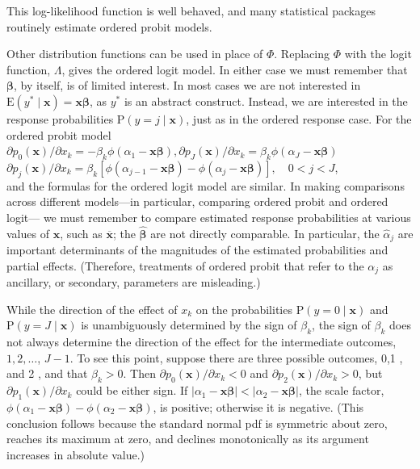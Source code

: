 \documentclass[10pt]{article}
\begin{document}
This log-likelihood function is well behaved, and many statistical packages routinely estimate ordered probit models.

Other distribution functions can be used in place of $\Phi$. Replacing $\Phi$ with the logit function, $\Lambda$, gives the ordered logit model. In either case we must remember that $\boldsymbol{\beta}$, by itself, is of limited interest. In most cases we are not interested in $\mathrm{E}\left(y^{*} \mid \mathbf{x}\right)=\mathbf{x} \boldsymbol{\beta}$, as $y^{*}$ is an abstract construct. Instead, we are interested in the response probabilities $\mathrm{P}(y=j \mid \mathbf{x})$, just as in the ordered response case. For the ordered probit model\\
$\partial p_{0}(\mathbf{x}) / \partial x_{k}=-\beta_{k} \phi\left(\alpha_{1}-\mathbf{x} \boldsymbol{\beta}\right), \partial p_{J}(\mathbf{x}) / \partial x_{k}=\beta_{k} \phi\left(\alpha_{J}-\mathbf{x} \boldsymbol{\beta}\right)$\\
$\partial p_{j}(\mathbf{x}) / \partial x_{k}=\beta_{k}\left[\phi\left(\alpha_{j-1}-\mathbf{x} \boldsymbol{\beta}\right)-\phi\left(\alpha_{j}-\mathbf{x} \boldsymbol{\beta}\right)\right], \quad 0<j<J$,\\
and the formulas for the ordered logit model are similar. In making comparisons across different models—in particular, comparing ordered probit and ordered logit— we must remember to compare estimated response probabilities at various values of $\mathbf{x}$, such as $\overline{\mathbf{x}}$; the $\hat{\boldsymbol{\beta}}$ are not directly comparable. In particular, the $\hat{\alpha}_{j}$ are important determinants of the magnitudes of the estimated probabilities and partial effects. (Therefore, treatments of ordered probit that refer to the $\alpha_{j}$ as ancillary, or secondary, parameters are misleading.)

While the direction of the effect of $x_{k}$ on the probabilities $\mathrm{P}(y=0 \mid \mathbf{x})$ and $\mathrm{P}(y=J \mid \mathbf{x})$ is unambiguously determined by the sign of $\beta_{k}$, the sign of $\beta_{k}$ does not always determine the direction of the effect for the intermediate outcomes, $1,2, \ldots$, $J-1$. To see this point, suppose there are three possible outcomes, 0,1 , and 2 , and that $\beta_{k}>0$. Then $\partial p_{0}(\mathbf{x}) / \partial x_{k}<0$ and $\partial p_{2}(\mathbf{x}) / \partial x_{k}>0$, but $\partial p_{1}(\mathbf{x}) / \partial x_{k}$ could be either sign. If $\left|\alpha_{1}-\mathbf{x} \boldsymbol{\beta}\right|<\left|\alpha_{2}-\mathbf{x} \boldsymbol{\beta}\right|$, the scale factor, $\phi\left(\alpha_{1}-\mathbf{x} \boldsymbol{\beta}\right)-\phi\left(\alpha_{2}-\mathbf{x} \boldsymbol{\beta}\right)$, is positive; otherwise it is negative. (This conclusion follows because the standard normal pdf is symmetric about zero, reaches its maximum at zero, and declines monotonically as its argument increases in absolute value.)
\end{document}
